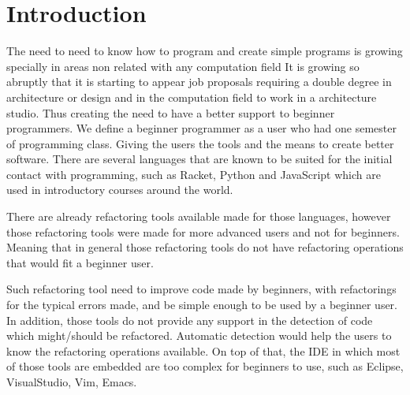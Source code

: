 \section{Introduction}



The need to  need to know how to program and create simple programs is growing
specially in areas non related with any computation field %
It is growing so abruptly that it is starting to appear job proposals requiring
a double degree in architecture or design and in the computation field
to work in a architecture studio. %
Thus creating the need to have a better support to beginner programmers.
We define a beginner programmer as a user who had one semester of programming class. %
Giving the users the tools and the means to create better software.
There are several languages that are known to be suited for the initial contact
with programming, such as Racket, Python and JavaScript which are used in introductory
courses around the world.

There are already refactoring tools available made for those languages, %
however those refactoring tools were made for more advanced users and not for beginners.
Meaning that in general those refactoring tools do not have refactoring operations that %
would fit a beginner user. %

Such refactoring tool need to improve code made by beginners, with refactorings for %
the typical errors made, and be simple enough to be used by a beginner user.
In addition, those tools do not provide any support in the detection of code which might/should
be refactored.
Automatic detection would help the users to know the refactoring operations available.
On top of that, the IDE in which most of those tools are embedded are too complex for beginners
to use, such as Eclipse, VisualStudio, Vim, Emacs. %

